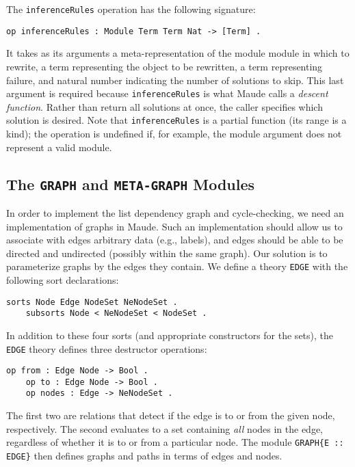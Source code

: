 \documentclass[11pt]{article}
\begin{document}
The \lstinline|inferenceRules| operation has the following signature:
\begin{lstlisting}[language=Maude, style=smalllisting]
    op inferenceRules : Module Term Term Nat -> [Term] .
\end{lstlisting}
It takes as its arguments a meta-representation of the module module in which
to rewrite, a term representing the object to be rewritten, a term representing
failure, and natural number indicating the number of solutions to skip. This
last argument is required because \lstinline|inferenceRules| is what Maude
calls a \emph{descent function}. Rather than return all solutions at once, the caller
specifies which solution is desired. Note that \lstinline|inferenceRules| is a
partial function (its range is a kind); the operation is undefined if, for
example, the module argument does not represent a valid module.

\subsection{The \lstinline|GRAPH| and \lstinline|META-GRAPH| Modules}
\label{subsection:graph-mod}

In order to implement the list dependency graph and cycle-checking, we need an
implementation of graphs in Maude. Such an implementation should allow us to
associate with edges arbitrary data (e.g., labels), and edges should be able to
be directed and undirected (possibly within the same graph). Our solution is to
parameterize graphs by the edges they contain. We define a theory
\lstinline|EDGE| with the following sort declarations:
\begin{lstlisting}[language=Maude, style=smalllisting]
    sorts Node Edge NodeSet NeNodeSet .
    subsorts Node < NeNodeSet < NodeSet .
\end{lstlisting}
In addition to these four sorts (and appropriate constructors for the sets),
the \lstinline|EDGE| theory defines three destructor operations:
\begin{lstlisting}[language=Maude, style=smalllisting]
    op from : Edge Node -> Bool .
    op to : Edge Node -> Bool .
    op nodes : Edge -> NeNodeSet .
\end{lstlisting}

The first two are relations that detect if the edge is to or from the given
node, respectively. The second evaluates to a set containing \emph{all} nodes
in the edge, regardless of whether it is to or from a particular node.  The
module \lstinline|GRAPH{E :: EDGE}| then defines graphs and paths in terms of
edges and nodes.
\end{document}
